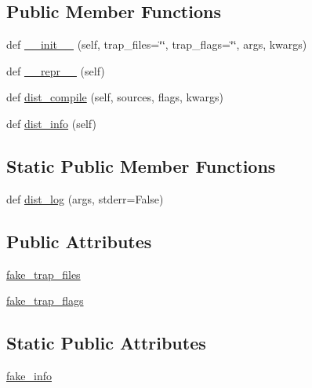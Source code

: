 \subsection*{Public Member Functions}
\begin{DoxyCompactItemize}
\item 
def \hyperlink{classnumpy_1_1distutils_1_1tests_1_1test__ccompiler__opt_1_1FakeCCompilerOpt_a8f7ac10646906c13e73375fea99b9515}{\+\_\+\+\_\+init\+\_\+\+\_\+} (self, trap\+\_\+files=\char`\"{}\char`\"{}, trap\+\_\+flags=\char`\"{}\char`\"{}, args, kwargs)
\item 
def \hyperlink{classnumpy_1_1distutils_1_1tests_1_1test__ccompiler__opt_1_1FakeCCompilerOpt_a9dd51a039b353e5779c573fb951cab38}{\+\_\+\+\_\+repr\+\_\+\+\_\+} (self)
\item 
def \hyperlink{classnumpy_1_1distutils_1_1tests_1_1test__ccompiler__opt_1_1FakeCCompilerOpt_a71d032e5e8f2ae5093d756056e25766a}{dist\+\_\+compile} (self, sources, flags, kwargs)
\item 
def \hyperlink{classnumpy_1_1distutils_1_1tests_1_1test__ccompiler__opt_1_1FakeCCompilerOpt_a4fd6f90006a6b47685f8e0f5b4f12f81}{dist\+\_\+info} (self)
\end{DoxyCompactItemize}
\subsection*{Static Public Member Functions}
\begin{DoxyCompactItemize}
\item 
def \hyperlink{classnumpy_1_1distutils_1_1tests_1_1test__ccompiler__opt_1_1FakeCCompilerOpt_a1397ec238778da4133124fa8d488a675}{dist\+\_\+log} (args, stderr=False)
\end{DoxyCompactItemize}
\subsection*{Public Attributes}
\begin{DoxyCompactItemize}
\item 
\hyperlink{classnumpy_1_1distutils_1_1tests_1_1test__ccompiler__opt_1_1FakeCCompilerOpt_ac538dfb9274f8c1e1eaf05f84ae8a24a}{fake\+\_\+trap\+\_\+files}
\item 
\hyperlink{classnumpy_1_1distutils_1_1tests_1_1test__ccompiler__opt_1_1FakeCCompilerOpt_abf418e524c32655912a1ae49be2aa540}{fake\+\_\+trap\+\_\+flags}
\end{DoxyCompactItemize}
\subsection*{Static Public Attributes}
\begin{DoxyCompactItemize}
\item 
\hyperlink{classnumpy_1_1distutils_1_1tests_1_1test__ccompiler__opt_1_1FakeCCompilerOpt_a7cc69cd23b44f46e150cb7026ebed495}{fake\+\_\+info}
\end{DoxyCompactItemize}


